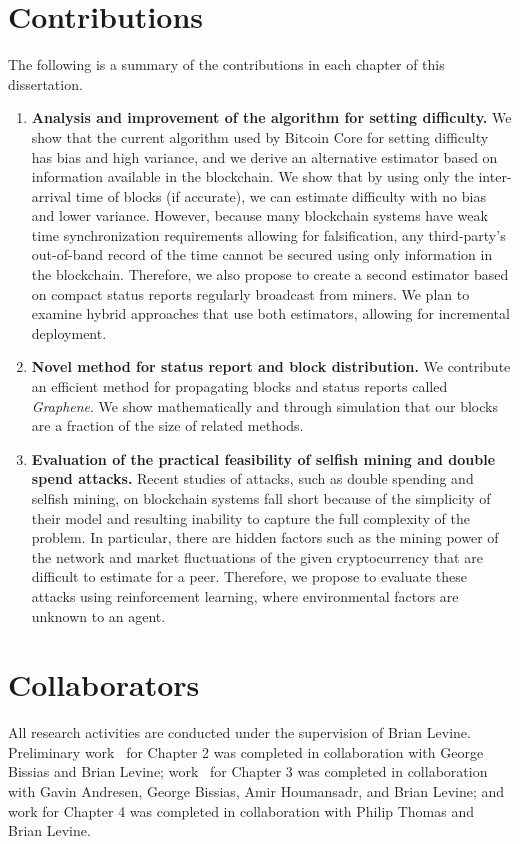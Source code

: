 \section*{Contributions}
The following is a summary of the contributions in each chapter of this dissertation. 
\begin{enumerate}
\item \textbf{Analysis and improvement of the algorithm for setting difficulty.} We show that the current algorithm used by Bitcoin Core for setting difficulty has bias and high variance, and we derive an alternative estimator based on information available in the blockchain. We show that by using only the inter-arrival time of blocks (if accurate), we can estimate difficulty with no bias and lower variance. However, because many blockchain systems have weak time synchronization requirements allowing for falsification, any third-party's out-of-band record of the time cannot be secured using only information in the blockchain. Therefore, we also propose to create a second estimator based on compact status reports regularly broadcast from miners. We plan to examine hybrid approaches that use both estimators, allowing for incremental deployment. 
\item \textbf{Novel method for status report and block distribution.} We contribute an efficient method for propagating blocks and status reports called \textit{Graphene}. We show mathematically and through simulation that our blocks are a fraction of the size of related methods.
\item \textbf{Evaluation of the practical feasibility of selfish mining and double spend attacks.} Recent studies of attacks, such as double spending and selfish mining, on blockchain systems fall short because of the simplicity of their model and resulting inability to capture the full complexity of the problem. In particular, there are hidden factors such as the mining power of the network and market fluctuations of the given cryptocurrency that are difficult to estimate for a peer. Therefore, we propose to evaluate these attacks using reinforcement learning, where environmental factors are unknown to an agent.
\end{enumerate}

\section*{Collaborators}
All research activities are conducted under the supervision of Brian Levine. Preliminary work~\cite{Ozisik:2017c} for Chapter 2 was completed in collaboration with George Bissias and Brian Levine; work~\cite{Ozisik:2017} for Chapter 3 was completed in collaboration with Gavin Andresen, George Bissias, Amir Houmansadr, and Brian Levine; and work for Chapter 4 was completed in collaboration with Philip Thomas and Brian Levine.